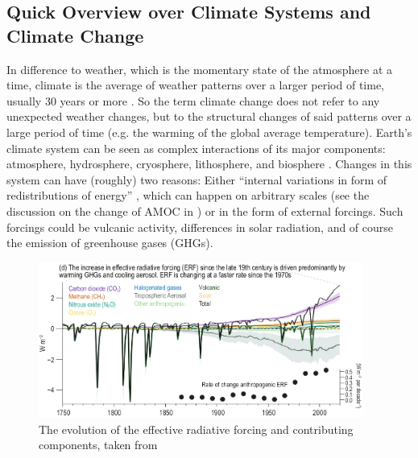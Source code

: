 \subsection{Quick Overview over Climate Systems and Climate Change}

%

In difference to weather, which is the momentary state of the atmosphere at a time, climate is the average of weather patterns over a larger period of time, usually 30 years or more \cite{noaa_whats_nodate}. 
So the term climate change does not refer to any unexpected weather changes, but to the structural changes of said patterns over a large period of time (e.g. the warming of the global average temperature). 
Earth's climate system can be seen as complex interactions of its major components: atmosphere, hydrosphere, cryosphere, lithosphere, and biosphere \cite{vietinghoffdiss, intergovernmental_panel_on_climate_change_ipcc_climate_2023}. 
Changes in this system can have (roughly) two reasons: 
Either \enquote{internal variations in form of redistributions of energy} \cite{vietinghoffdiss}, which can happen on arbitrary scales (see the discussion on the change of AMOC in \cite{lobelle_detectability_2020}) or in the form of external forcings. 
Such forcings could be vulcanic activity, differences in solar radiation, and of course the emission of greenhouse gases (GHGs). 

\begin{figure}[htb]
  \begin{center}
    \includegraphics[width=0.95\textwidth]{figures/ERF_change_with_forcings.png}
  \end{center}
  \caption{The evolution of the effective radiative forcing and contributing components, taken from \cite{intergovernmental_panel_on_climate_change_ipcc_climate_2023}}\label{fig:erf-with-forcings}
\end{figure}

